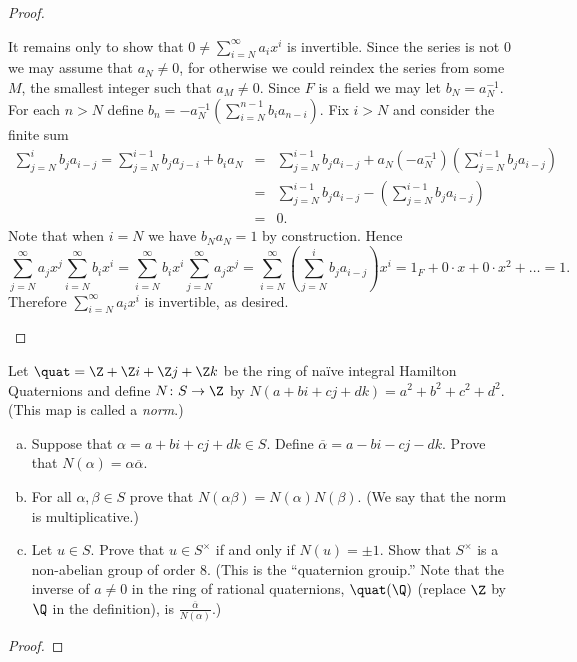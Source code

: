 \documentclass[10pt]{amsart}
\begin{document}
\begin{thm}
\begin{proof}
\begin{enumerate}[(a)]
      It remains only to show that $0 \neq \sum_{i=N}^\infty a_ix^i$ is invertible.
      Since the series is not $0$ we may assume that $a_N \neq 0$, for otherwise we could reindex the series from some $M$, the smallest integer such that $a_M \neq 0$.
      Since $F$ is a field we may let $b_N = a_N^{-1}$.
      For each $n > N$ define $b_n = -a_N^{-1}\left(\sum_{i=N}^{n-1} b_ia_{n-i}\right)$.
      Fix $i > N$ and consider the finite sum
      \begin{eqnarray*}
        \sum_{j=N}^i b_ja_{i-j} = \sum_{j=N}^{i-1} b_ja_{j-i} + b_ia_N &=& \sum_{j=N}^{i-1} b_ja_{i-j} + a_N(-a_N^{-1})\left(\sum_{j=N}^{i-1} b_ja_{i-j}\right)\\
        &=& \sum_{j=N}^{i-1} b_ja_{i-j} - \left(\sum_{j=N}^{i-1} b_ja_{i-j}\right)\\ 
        &=& 0.
      \end{eqnarray*}
      Note that when $i = N$ we have $b_Na_N = 1$ by construction.
      Hence 
      $$\sum_{j=N}^\infty a_jx^j\sum_{i=N}^\infty b_ix^i = \sum_{i=N}^\infty b_ix^i \sum_{j=N}^\infty a_jx^j = \sum_{i=N}^\infty \left(\sum_{j=N}^i b_ja_{i-j}\right)x^i = 1_F + 0\cdot x + 0\cdot x^2 + \ldots = 1.$$
      Therefore $\sum_{i=N}^\infty a_ix^i$ is invertible, as desired.
    \end{enumerate}
  \end{proof}
\end{thm}

\begin{thm}
  Let $\quat = \Z + \Z i + \Z j + \Z k$ be the ring of na\"{i}ve integral Hamilton Quaternions and define $N \colon S \rightarrow \Z$ by $N(a + bi + cj + dk) = a^2 + b^2 + c^2 + d^2$.
  (This map is called a {\it norm}.)
  \begin{enumerate}[(a)]
  \item
    Suppose that $\alpha = a + bi + cj + dk \in S$.
    Define $\overline{\alpha} = a - bi - cj - dk$.
    Prove that $N(\alpha) = \alpha \overline{\alpha}$.
  \item
    For all $\alpha, \beta \in S$ prove that $N(\alpha\beta) = N(\alpha)N(\beta)$.
    (We say that the norm is multiplicative.)
  \item
    Let $u \in S$.
    Prove that $u \in S^\times$ if and only if $N(u) = \pm 1$.
    Show that $S^\times$ is a non-abelian group of order 8.
    (This is the ``quaternion grouip.''
    Note that the inverse of $a \neq 0$ in the ring of rational quaternions, $\quat(\Q)$ (replace $\Z$ by $\Q$ in the definition), is $\frac{\overline{\alpha}}{N(\alpha)}$.)
  \end{enumerate}
  \begin{proof}
  \end{proof}
\end{thm}
\end{document}
